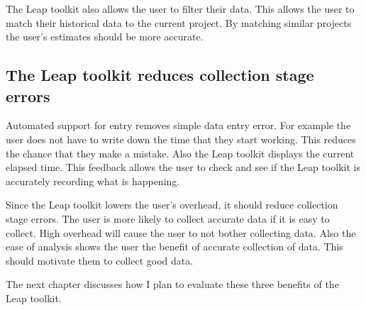The Leap toolkit also allows the user to filter their data.  This allows the
user to match their historical data to the current project. By matching similar 
projects the user's estimates should be more accurate.

\subsection{The Leap toolkit reduces collection stage errors}

Automated support for entry removes simple data entry error.  For example the
user does not have to write down the time that they start working.  This
reduces the chance that they make a mistake.  Also the Leap toolkit displays
the current elapsed time.  This feedback allows the user to check and see if
the Leap toolkit is accurately recording what is happening.

Since the Leap toolkit lowers the user's overhead, it should reduce collection
stage errors.  The user is more likely to collect accurate data if it is easy
to collect.  High overhead will cause the user to not bother collecting data.
Also the ease of analysis shows the user the benefit of accurate collection of
data.  This should motivate them to collect good data.


The next chapter discusses how I plan to evaluate these three benefits of the
Leap toolkit.
